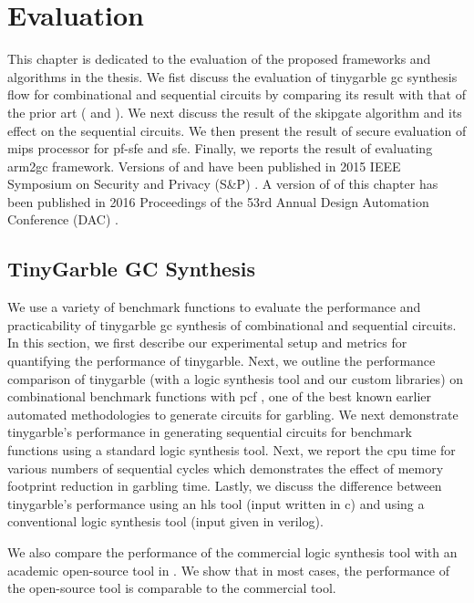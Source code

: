 \chapter{Evaluation}\label{chap:eval}
This chapter is dedicated to the evaluation of the proposed frameworks and algorithms in the thesis.
We fist discuss the evaluation of \gls{tinygarble} \acrshort{gc} synthesis flow for combinational and sequential circuits by comparing its result with that of the prior art ( and ).
We next discuss the result of the \gls{skipgate} algorithm and its effect on the sequential circuits.
We then present the result of secure evaluation of \gls{mips} processor for \acrshort{pf-sfe} and \acrshort{sfe}.
Finally, we reports the result of evaluating \gls{arm2gc} framework.
Versions of  and  have been published in 2015 IEEE Symposium on Security and Privacy (S\&P) \cite{songhori2015tinygarble}.
A version of  of this chapter has been published in 2016 Proceedings of the 53rd Annual Design Automation Conference (DAC) \cite{songhori2016garbledcpu}.


\section{TinyGarble GC Synthesis}\label{sec:eval-tinygarble}
We use a variety of benchmark functions to evaluate the performance and practicability of \gls{tinygarble} \acrshort{gc} synthesis of combinational and sequential circuits.
In this section, we first describe our experimental setup and metrics for quantifying the performance of \gls{tinygarble}.
Next, we outline the performance comparison of \gls{tinygarble} (with a logic synthesis tool and our custom libraries) on combinational benchmark functions with \gls{pcf} \cite{kreuter2013pcf}, one of the best known earlier automated methodologies to generate circuits for garbling.
We next demonstrate \gls{tinygarble}'s performance in generating sequential circuits for benchmark functions using a standard logic synthesis tool.
Next, we report the \acrshort{cpu} time for various numbers of sequential cycles which demonstrates the effect of memory footprint reduction in garbling time.
Lastly, we discuss the difference between \gls{tinygarble}'s performance using an \acrshort{hls} tool (input written in \gls{c}) and using a conventional logic synthesis tool (input given in \gls{verilog}).

We also compare the performance of the commercial logic synthesis tool with an academic open-source tool in .
We show that in most cases, the performance of the open-source tool is comparable to the commercial tool.


